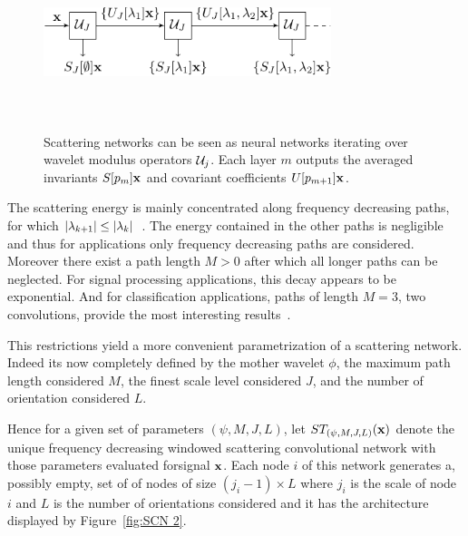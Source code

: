 \documentclass{article}
\begin{document}
    \begin{figure}
      \begin{center}
        \includegraphics[width=3.3in, height=2in, keepaspectratio]{scatnet_crop.pdf}
        \caption[Scattering convolution network.]{\centering  Scattering networks can be seen as neural networks iterating over wavelet  modulus  operators $\mathcal{U}_{j}$. Each layer $m$ outputs the averaged  invariants $S[p_{m}]{\bf x}$ and covariant coefficients $U[p_{m+1}]{\bf x}$.}
        \label{fig:SCN 1}
      \end{center}
      \vspace{-15pt}
    \end{figure}
    
    The scattering energy is mainly concentrated along frequency decreasing paths, \ie for which $\left| \lambda_{k+1} \right| \leq \left| \lambda_{k} \right|$~\cite{mallat2012gis}. The energy contained in the other paths is negligible and thus for applications only frequency decreasing paths are considered. Moreover there exist a path length $M > 0$ after which all longer paths can be neglected. For signal processing applications, this decay appears to be exponential. And for classification applications, paths of length $M = 3$, \ie two convolutions, provide the most interesting results~\cite{anden2011multiscale, bruna2010classification}.
      
    This restrictions yield a more convenient parametrization of a scattering network. Indeed its now completely defined by the mother wavelet $\phi$, the maximum path length considered $M$, the finest scale level considered $J$, and the number of orientation considered $L$.
      
    Hence for a given set of parameters $(\psi, M,J,L)$, let $ST_{(\psi,M,J,L)}({\bf x})$ denote the unique frequency decreasing windowed scattering convolutional network with those parameters evaluated forsignal ${\bf x}$. Each node $i$ of this network generates a, possibly empty, set of of nodes of size $(j_{i}-1) \times L$ where $j_{i}$ is the scale of node $i$ and $L$ is the number of orientations considered and it has the architecture displayed by Figure~\ref{fig:SCN 2}.
\end{document}
